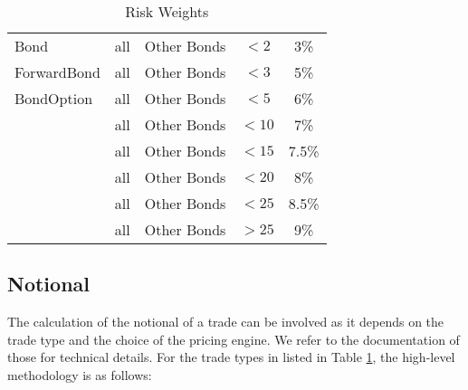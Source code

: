 \begin{table}[htpb]
\begin{tabular}{|l | c | c| c | c |}
		Bond        & all & Other Bonds     & $<2$  & 3\%    \\
		ForwardBond & all & Other Bonds     & $<3$  & 5\%    \\
		BondOption  & all & Other Bonds     & $<5$  & 6\%    \\
		& all & Other Bonds     & $<10$ & 7\%    \\
		& all & Other Bonds     & $<15$ & 7.5\%  \\
		& all & Other Bonds     & $<20$ & 8\%    \\
		& all & Other Bonds     & $<25$ & 8.5\%  \\
		& all & Other Bonds     & $>25$ & 9\% \\
		\hline
	\end{tabular}
	\caption{Risk Weights}
	\label{smrc_risk_weights}
\end{table}

\subsection{Notional}

The calculation of the notional of a trade can be involved as it depends on the trade type and the choice of the pricing engine. We refer to the documentation of those for technical details. For the trade types in listed in Table \ref{smrc_risk_weights}, the high-level methodology is as follows:

